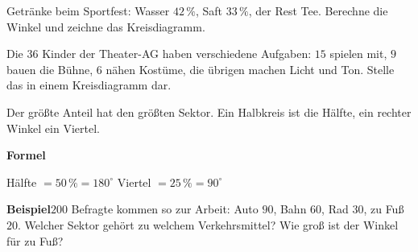 \documentclass[11pt]{article}
\makeatletter
\newcommand{\aufgg}[4]{\par\noindent\makebox[0pt][r]{#4}\begin{minipage}[t]{0.6\linewidth}\vspace{0pt}#1\end{minipage}\hfill
  \begin{minipage}[t]{0.37\linewidth}\vspace{0pt}\centering #2\end{minipage}\par}
\newcommand{\nr}[1]{\makebox[7mm][l]{\textbf{#1}}}
\newlength{\kr}
\newcommand{\karomerk}[2]{\protected@write\@auxout{}{\string\karoseite{#1}{#2}{\thepage}}}
\newcommand{\karoseite}[3]{\expandafter\xdef\csname karo@#1@#2\endcsname{#3}}
\makeatother
\begin{document}
\medskip
\aufgg{\nr{2.}Getränke beim Sportfest: Wasser $42\,\%$, Saft $33\,\%$, der Rest Tee. Berechne die Winkel und zeichne das Kreisdiagramm.}{}{}{}
\medskip
\aufgg{\nr{3.}Die $36$ Kinder der Theater-AG haben verschiedene Aufgaben: $15$ spielen mit, $9$ bauen die Bühne, $6$ nähen Kostüme, die übrigen machen Licht und Ton. Stelle das in einem Kreisdiagramm dar.}{\adjustbox{max width=\linewidth}{\begin{varwidth}{50cm}\kreisleer[1.3]\end{varwidth}}}{}{{\scriptsize\color{mbgrau}Ziel\hspace{2mm}}}
\medskip
\par\vspace{3mm}\setlength{\kr}{\dimexpr\pagegoal-\pagetotal-10mm\relax}%
\ifdim\kr>12mm\karomerk{k}{C}\noindent{\scriptsize\color{mbgrau}Platz zum Rechnen}\par\nointerlineskip\vspace{1mm}\noindent
\begin{tikzpicture}\clip (0,0) rectangle ({\linewidth-0.5mm},\kr);\draw[black!16,line width=0.3pt,step=5mm] (0,0) grid (\linewidth,\kr);\end{tikzpicture}\fi\par
\clearpage\label{s:D}\noindent\colorbox{black!12}{}\hspace{3mm}{\Large\bfseries Kreisdiagramme lesen und zuordnen}\par\smallskip
\noindent Der größte Anteil hat den größten Sektor. Ein Halbkreis ist die Hälfte, ein rechter Winkel ein Viertel.\par\medskip
\noindent\textbf{Formel}\par\nopagebreak\noindent\hspace*{4mm}\begin{minipage}{\dimexpr\linewidth-4mm\relax}Hälfte $= 50\,\% = 180^\circ$ \qquad Viertel $= 25\,\% = 90^\circ$\end{minipage}\par\medskip
\noindent\textbf{Beispiel}\quad $200$ Befragte kommen so zur Arbeit: Auto $90$, Bahn $60$, Rad $30$, zu Fuß $20$. Welcher Sektor gehört zu welchem Verkehrsmittel? Wie groß ist der Winkel für zu Fuß?\par\smallskip
\end{document}
